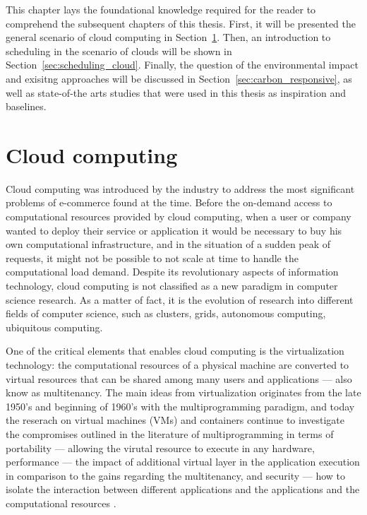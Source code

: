 This chapter lays the foundational knowledge required for the reader to comprehend the subsequent chapters of this thesis. First, it will be presented the general scenario of cloud computing in Section~\ref{sec:cloud}. Then, an introduction to scheduling in the scenario of clouds will be shown in Section~\ref{sec:scheduling_cloud}. Finally, the question of the environmental impact and exisitng approaches will be discussed in Section~\ref{sec:carbon_responsive}, as well as state-of-the arts studies that were used in this thesis as inspiration and baselines.

\section{Cloud computing}

\label{sec:cloud}

Cloud computing was introduced by the industry to address the most significant problems of e-commerce found at the time. Before the on-demand access to computational resources provided by cloud computing, when a user or company wanted to deploy their service or application it would be necessary to buy his own computational infrastructure, and in the situation of a sudden peak of requests, it might not be possible to not scale at time to handle the computational load demand. Despite its revolutionary aspects of information technology, cloud computing is not classified as a new paradigm in computer science research. As a matter of fact, it is the evolution of research into different fields of computer science, such as clusters, grids, autonomous computing, ubiquitous computing. 

One of the critical elements that enables cloud computing is the virtualization technology: the computational resources of a physical machine are converted to virtual resources that can be shared among many users and applications --- also know as multitenancy.  The main ideas from virtualization originates from the late 1950's and beginning of 1960's with the multiprogramming paradigm, and today the reserach on virtual machines (VMs) and containers continue to investigate the compromises outlined in the literature of multiprogramming in terms of portability --- allowing the virutal resource to execute in any hardware,  performance --- the impact of additional virtual layer in the application execution in comparison to the gains regarding the multitenancy, and security --- how to isolate the interaction between different applications and the applications and the computational resources \cite{randall2020_virtualization}.

